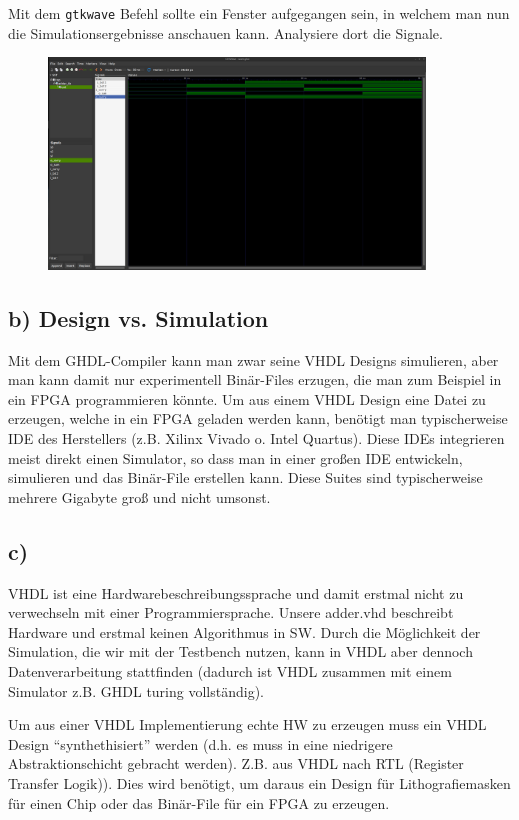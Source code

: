 \documentclass[a4paper]{scrartcl}
\begin{document}
Mit dem \texttt{gtkwave} Befehl sollte ein Fenster aufgegangen sein, in welchem man nun die Simulationsergebnisse anschauen kann. Analysiere dort die Signale.
  \begin{figure}[h]
    \centering
    \includegraphics[width=10cm]{gtkwave.png}
  \end{figure}
  


\subsection*{b) Design vs. Simulation}
Mit dem GHDL-Compiler kann man zwar seine VHDL Designs simulieren, aber man kann damit nur experimentell Binär-Files erzugen, die man zum Beispiel in ein FPGA programmieren könnte. 
Um aus einem VHDL Design eine Datei zu erzeugen, welche in ein FPGA geladen werden kann, benötigt man typischerweise IDE des Herstellers (z.B. Xilinx Vivado o.
Intel Quartus). Diese IDEs integrieren meist direkt einen Simulator, so dass man in einer großen IDE entwickeln, simulieren und das Binär-File erstellen kann. Diese
Suites sind typischerweise mehrere Gigabyte groß und nicht umsonst.

\subsection*{c)}
VHDL ist eine Hardwarebeschreibungssprache und damit erstmal nicht zu verwechseln mit einer Programmiersprache. Unsere adder.vhd beschreibt Hardware und erstmal keinen Algorithmus 
in SW. Durch die Möglichkeit der Simulation, die wir mit der Testbench nutzen, kann in VHDL aber dennoch Datenverarbeitung stattfinden (dadurch ist VHDL zusammen mit einem
Simulator z.B. GHDL turing vollständig).

Um aus einer VHDL Implementierung echte HW zu erzeugen  muss ein VHDL Design ``synthethisiert'' werden (d.h. es muss in eine niedrigere Abstraktionschicht gebracht werden).
Z.B. aus VHDL nach RTL (Register Transfer Logik)). Dies wird
benötigt, um daraus ein Design für Lithografiemasken für einen Chip oder das Binär-File für ein FPGA zu erzeugen. 
\end{document}
